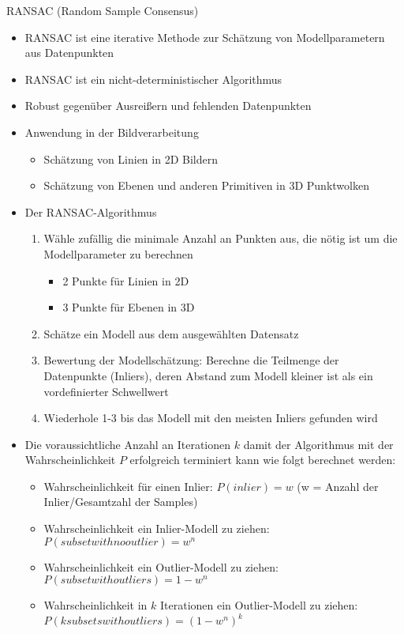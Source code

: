 \documentclass[paper=a4, fontsize=11pt]{scrartcl} %
\numberwithin{equation}{section} %
\numberwithin{figure}{section} %
\numberwithin{table}{section} %
\begin{document}
RANSAC (Random Sample Consensus)
\begin{itemize}
\item RANSAC ist eine iterative Methode zur Schätzung von Modellparametern aus Datenpunkten
\item RANSAC ist ein nicht-deterministischer Algorithmus
\item Robust gegenüber Ausreißern und fehlenden Datenpunkten
\item Anwendung in der Bildverarbeitung
\begin{itemize}
\item Schätzung von Linien in 2D Bildern
\item Schätzung von Ebenen und anderen Primitiven in 3D Punktwolken
\end{itemize}
\item Der RANSAC-Algorithmus
\begin{enumerate}
\item Wähle zufällig die minimale Anzahl an Punkten aus, die nötig ist um die Modellparameter zu berechnen
\begin{itemize}
\item 2 Punkte für Linien in 2D
\item 3 Punkte für Ebenen in 3D
\end{itemize}
\item Schätze ein Modell aus dem ausgewählten Datensatz
\item Bewertung der Modellschätzung: Berechne die Teilmenge der Datenpunkte (Inliers), deren Abstand zum Modell kleiner ist als ein vordefinierter Schwellwert
\item Wiederhole 1-3 bis das Modell mit den meisten Inliers gefunden wird
\end{enumerate}
\item Die voraussichtliche Anzahl an Iterationen $k$ damit der Algorithmus mit der
Wahrscheinlichkeit $P$ erfolgreich terminiert kann wie folgt berechnet werden:
\begin{itemize}
\item Wahrscheinlichkeit für einen Inlier: $P(inlier) = w$ (w = Anzahl der Inlier/Gesamtzahl der Samples)
\item Wahrscheinlichkeit ein Inlier-Modell zu ziehen: $P(subset with no outlier) = w^n$
\item Wahrscheinlichkeit ein Outlier-Modell zu ziehen: $P(subset with outliers) = 1-w^n$
\item Wahrscheinlichkeit in $k$ Iterationen ein Outlier-Modell zu ziehen: $P(k subsets with outliers) = (1-w^n)^k$

\end{itemize}
\end{itemize}
\end{document}
